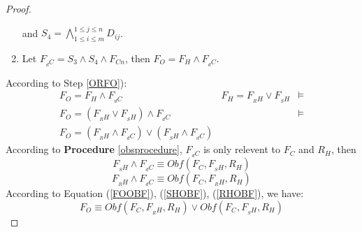 \documentclass[conference]{IEEEtran}
\begin{document}
\begin{proof}
\begin{enumerate}
\begin{itemize}
\end{itemize}
and $S_4=\bigwedge_{1\leqslant i\leqslant m}^{1\leqslant j\leqslant n} D_{ij}$.
\item\label{ORFO}
Let  $F_{_dC} =S_3\wedge S_4 \wedge F_{Cn}$, then $F_O=F_H \wedge F_{_dC}$.
\end{enumerate}
According to Step \ref{ORFO}):
\begin{equation}\label{FOOBF}
\begin{array}{ccc}
F_O  =  F_H \wedge F_{_dC}                                   &F_H=F_{_RH}\vee F_{_SH}&\models\\
F_O  =  (F_{_RH}\vee F_{_SH})\wedge F_{_dC}                  &                       &\models\\
F_O  =  (F_{_RH} \wedge F_{_dC})\vee(F_{_SH}\wedge F_{_dC})  &                       &
\end{array}
\end{equation}
According to \textbf{Procedure} \ref{obsprocedure}, $F_{_dC}$ is only relevent to $F_C$ and $R_H$, then \\
\begin{equation}\label{SHOBF}
F_{_SH} \wedge F_{_dC} \equiv Obf(F_C,F_{_SH},R_H)
\end{equation} 
\begin{equation}\label{RHOBF}
F_{_RH} \wedge F_{_dC} \equiv Obf(F_C,F_{_RH},R_H)
\end{equation} 
According to Equation (\ref{FOOBF}), (\ref{SHOBF}), (\ref{RHOBF}), we have:
 \begin{equation}
F_O \equiv Obf(F_C,F_{_RH} ,R_H)
\vee Obf(F_C,F_{_SH} ,R_H)  
 \end{equation}

\end{proof}
\end{document}
